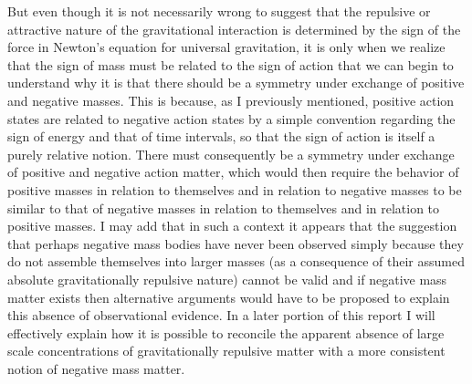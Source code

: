 \documentclass[notitlepage,12pt]{report}
\begin{document}
But even though it is not necessarily wrong to suggest that the repulsive or attractive nature of the gravitational interaction is determined by the sign of the force in Newton's equation for universal gravitation, it is only when we realize that the sign of mass must be related to the sign of action that we can begin to understand why it is that there should be a symmetry under exchange of positive and negative masses. This is because, as I previously mentioned, positive action states are related to negative action states by a simple convention regarding the sign of energy and that of time intervals, so that the sign of action is itself a purely relative notion. There must consequently be a symmetry under exchange of positive and negative action matter, which would then require the behavior of positive masses in relation to themselves and in relation to negative masses to be similar to that of negative masses in relation to themselves and in relation to positive masses. I may add that in such a context it appears that the suggestion that perhaps negative mass bodies have never been observed simply because they do not assemble themselves into larger masses (as a consequence of their assumed absolute gravitationally repulsive nature) cannot be valid and if negative mass matter exists then alternative arguments would have to be proposed to explain this absence of observational evidence. In a later portion of this report I will effectively explain how it is possible to reconcile the apparent absence of large scale concentrations of gravitationally repulsive matter with a more consistent notion of negative mass matter.
\end{document}
